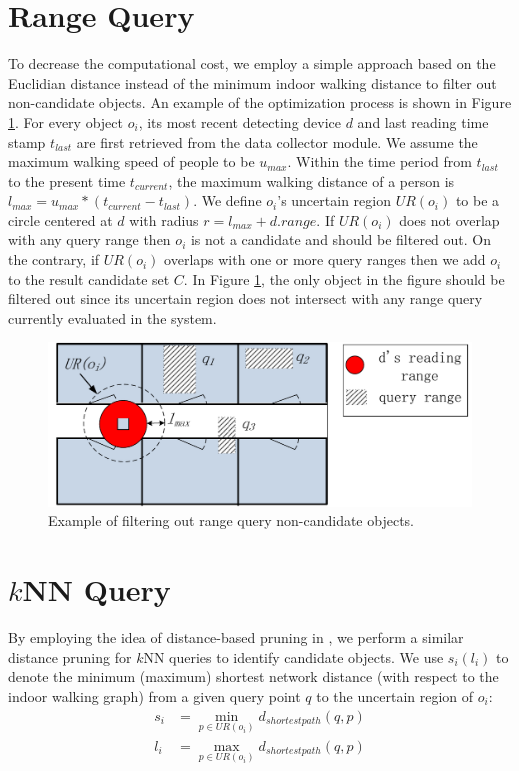\documentclass[12pt]{report}
\begin{document}
\section{Range Query}
\label{sec:range-query}
To decrease the computational cost, we employ a simple approach
based on the Euclidian distance instead of the minimum indoor
walking distance \cite{yang2010-probabilistic} to filter out
non-candidate objects.  An example of the optimization process is
shown in Figure \ref{fig:range-filter-non-candidates}.  For every object
\(o_i\), its most recent detecting device \(d\) and last reading
time stamp \(t_{last}\) are first retrieved from the data
collector module.  We assume the maximum walking speed of people
to be \(u_{max}\).  Within the time period from \(t_{last}\) to
the present time \(t_{current}\), the maximum walking distance of
a person is \(l_{max}=u_{max}*(t_{current}-t_{last})\).  We define
\(o_i\)'s uncertain region \(UR(o_i)\) to be a circle centered at
\(d\) with radius \(r=l_{max}+d.range\).  If \(UR(o_i)\) does not
overlap with any query range then \(o_i\) is not a candidate and
should be filtered out.  On the contrary, if \(UR(o_i)\) overlaps
with one or more query ranges then we add \(o_i\) to the result
candidate set \(C\).  In Figure \ref{fig:range-filter-non-candidates},
the only object in the figure should be filtered out since its
uncertain region does not intersect with any range query currently
evaluated in the system.

\begin{figure}[htbp]
\centering
\includegraphics[width=.7\textwidth]{img/range-filter-non-candidates.pdf}
\caption{\label{fig:range-filter-non-candidates}
Example of filtering out range query non-candidate objects.}
\end{figure}

\section{\(k\)NN Query}
\label{sec:knn-query}
By employing the idea of distance-based pruning in
\cite{yang2009-scalable}, we perform a similar distance pruning for
\(k\)NN queries to identify candidate objects.  We use \(s_i
    (l_i)\) to denote the minimum (maximum) shortest network distance
(with respect to the indoor walking graph) from a given query
point \(q\) to the uncertain region of \(o_i\):
\begin{equation}
  \begin{split}
    s_i &= \min_{p\in UR(o_i)} d_{shortestpath}(q, p)\\
    l_i &= \max_{p\in UR(o_i)} d_{shortestpath}(q, p)
  \end{split}
\end{equation}
\end{document}
